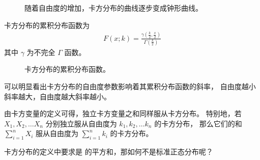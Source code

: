 \documentclass[letterpaper,10pt,english]{sphinxmanual}
\begin{document}
\begin{figure}[htbp]
\centering
\capstart

\noindent{}
\caption{随着自由度的增加，卡方分布的曲线逐步变成钟形曲线。}\label{\detokenize{_u6982_u7387_u57fa_u7840/content:id31}}\label{\detokenize{_u6982_u7387_u57fa_u7840/content:fg-probability-011}}\end{figure}

卡方分布的累积分布函数为
\begin{equation}\label{equation:概率基础/content:概率基础/content:77}
\begin{split}F(x;k) = \frac{\gamma (\frac{k}{2},\frac{x}{2}) }{\Gamma (\frac{k}{2})}\end{split}
\end{equation}
其中 \(\gamma\) 为不完全 \(\Gamma\) 函数。

\begin{figure}[htbp]
\centering
\capstart

\noindent{}
\caption{卡方分布的累积分布函数。}\label{\detokenize{_u6982_u7387_u57fa_u7840/content:id32}}\label{\detokenize{_u6982_u7387_u57fa_u7840/content:fg-probability-012}}\end{figure}

可以明显看出卡方分布的自由度参数影响着其累积分布函数的斜率，
自由度越小斜率越大，自由度越大斜率越小。


由卡方变量的定义可得，独立卡方变量之和同样服从卡方分布。
特别地，若 \(X_{1},X_{2},\dots X_{n}\)
分别独立服从自由度为 \(k_{1},k_{2},\dots k_{n}\) 的卡方分布，
那么它们的和 \(\sum _{i=1}^{n} X_{i}\)
服从自由度为 \(\sum _{i=1}^{n}k_{i}\) 的卡方分布。


卡方分布的定义中要求是 
的平方和，那如何不是标准正态分布呢？
\end{document}
